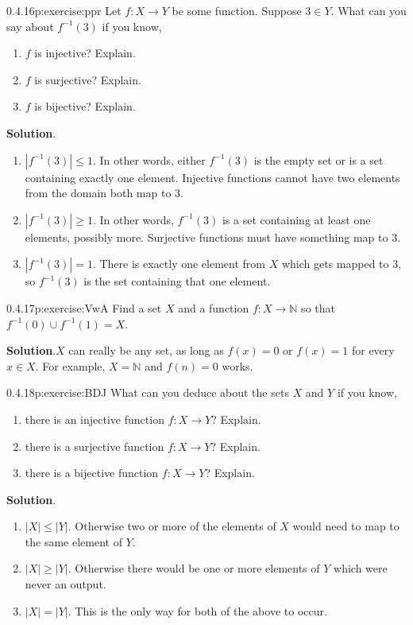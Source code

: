 \documentclass[twoside,11pt,]{book}
\newcommand{\blocktitlefont}{\relax}
\numberwithin{equation}{chapter}
\newcommand{\N}{\mathbb N}
\newcommand{\inv}{^{-1}}
\begin{document}
\begin{divisionsolution}{0.4.16}{}{p:exercise:ppr}%
Let \(f:X \to Y\) be some function. Suppose \(3 \in Y\). What can you say about \(f\inv(3)\) if you know,%
\begin{enumerate}[label=(\alph*)]
\item{}\(f\) is injective? Explain.%
\item{}\(f\) is surjective? Explain.%
\item{}\(f\) is bijective? Explain.%
\end{enumerate}
%
\par\smallskip%
\noindent\textbf{\blocktitlefont Solution}.\quad{}%
\begin{enumerate}[label=(\alph*)]
\item{}\(|f\inv(3)| \le 1\). In other words, either \(f\inv(3)\) is the empty set or is a set containing exactly one element. Injective functions cannot have two elements from the domain both map to 3.%
\item{}\(|f\inv(3)| \ge 1\). In other words, \(f\inv(3)\) is a set containing at least one elements, possibly more. Surjective functions must have something map to 3.%
\item{}\(|f\inv(3)| = 1\). There is exactly one element from \(X\) which gets mapped to 3, so \(f\inv(3)\) is the set containing that one element.%
\end{enumerate}
%
\end{divisionsolution}%
\begin{divisionsolution}{0.4.17}{}{p:exercise:VwA}%
Find a set \(X\) and a function \(f:X \to \N\) so that \(f\inv(0) \cup f\inv(1) = X\).%
\par\smallskip%
\noindent\textbf{\blocktitlefont Solution}.\quad{}\(X\) can really be any set, as long as \(f(x) = 0\) or \(f(x) = 1\) for every \(x \in X\). For example, \(X = \N\) and \(f(n) = 0\) works.%
\end{divisionsolution}%
\begin{divisionsolution}{0.4.18}{}{p:exercise:BDJ}%
What can you deduce about the sets \(X\) and \(Y\) if you know,%
\begin{enumerate}[label=(\alph*)]
\item{}there is an injective function \(f:X \to Y\)? Explain.%
\item{}there is a surjective function \(f:X \to Y\)? Explain.%
\item{}there is a bijective function \(f:X \to Y\)? Explain.%
\end{enumerate}
%
\par\smallskip%
\noindent\textbf{\blocktitlefont Solution}.\quad{}%
\begin{enumerate}[label=(\alph*)]
\item{}\(|X| \le |Y|\). Otherwise two or more of the elements of \(X\) would need to map to the same element of \(Y\).%
\item{}\(|X| \ge |Y|\). Otherwise there would be one or more elements of \(Y\) which were never an output.%
\item{}\(|X| = |Y|\). This is the only way for both of the above to occur.%
\end{enumerate}
%
\end{divisionsolution}%
\end{document}
